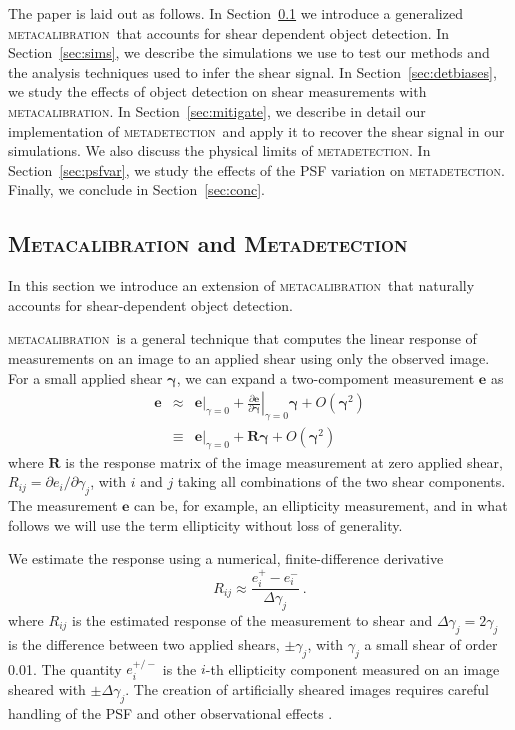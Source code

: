 \documentclass[draft, iop, twocolappendix, appendixfloats, numberedappendix, apj]{hackemulateapj}
\newcommand{\mcal}{\textsc{metacalibration}}
\newcommand{\mdet}{\textsc{metadetection}}
\begin{document}
The paper is laid out as follows. In Section~\ref{sec:mdet} we introduce a
generalized \mcal\ that accounts for shear dependent object detection.  In
Section~\ref{sec:sims}, we describe the simulations we use to test our methods
and the analysis techniques used to infer the shear signal. In
Section~\ref{sec:detbiases}, we study the effects of object detection on shear
measurements with \mcal.  In Section~\ref{sec:mitigate}, we describe in detail 
our implementation of \mdet\ and apply it to recover the shear signal
in our simulations. We also discuss the physical limits of
\mdet.  In Section~\ref{sec:psfvar}, we study the effects of the PSF
variation on \mdet.  Finally, we conclude in Section~\ref{sec:conc}.

\subsection{\textsc{Metacalibration} and \textsc{Metadetection}}
\label{sec:mdet}

In this section we introduce an extension of \mcal\ that naturally accounts for
shear-dependent object detection.

\mcal\ is a general technique that computes the linear response of measurements
on an image to an applied shear using only the observed image.  For a small
applied shear $\boldsymbol{\gamma}$, we can expand a two-compoment
measurement $\boldsymbol{e}$ as
\begin{eqnarray}
\boldsymbol{e} & \approx & \left.\boldsymbol{e}\right|_{\gamma=0} +
                           \left.\frac{\partial \boldsymbol{e}}{\partial\boldsymbol\gamma}\right|_{\gamma=0} \boldsymbol\gamma +
                           O(\boldsymbol\gamma^2)\nonumber\\
               & \equiv  & \left.\boldsymbol{e}\right|_{\gamma=0} +
                           \boldsymbol{R} \boldsymbol\gamma +
                           O(\boldsymbol\gamma^2)
\end{eqnarray}
where $\boldsymbol{R}$ is the response matrix of the image measurement
at zero applied shear, $R_{ij}=\partial e_i /\partial \gamma_j$, with $i$ and
$j$ taking all combinations of the two shear components.  The measurement
$\boldsymbol{e}$ can be, for example,  an ellipticity measurement, and in what
follows we will use the term ellipticity without loss of generality.

We estimate the response using a numerical, finite-difference derivative
\begin{equation}
R_{ij} \approx \frac{e_i^{+} - e_i^{-}}{\Delta\gamma_j}\ .
\end{equation}
where $R_{ij}$ is the estimated response of the measurement to shear and
$\Delta\gamma_j = 2 \gamma_j$ is the difference between two applied shears,
$\pm \gamma_j$, with $\gamma_j$ a small shear of order 0.01. The quantity
$e_i^{+/-}$ is the $i$-th ellipticity component measured on an image sheared
with $\pm\Delta\gamma_j$.  The creation of artificially sheared images requires
careful handling of the PSF and other observational effects
\citep{SheldonMcal2017}.
\end{document}
